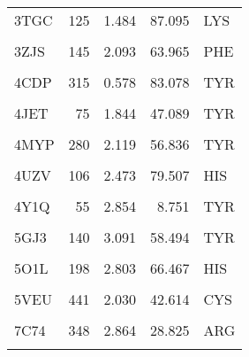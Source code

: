 \begin{table}
{\begin{tabular}{lrrrl}
				\addlinespace
				3TGC & 125 & 1.484 & 87.095 & LYS\\
				\cellcolor{gray!6}{3VP5} & \cellcolor{gray!6}{149} & \cellcolor{gray!6}{2.237} & \cellcolor{gray!6}{49.264} & \cellcolor{gray!6}{HIS}\\
				3ZJS & 145 & 2.093 & 63.965 & PHE\\
				\cellcolor{gray!6}{4B8N} & \cellcolor{gray!6}{71} & \cellcolor{gray!6}{1.755} & \cellcolor{gray!6}{70.933} & \cellcolor{gray!6}{HIS}\\
				4CDP & 315 & 0.578 & 83.078 & TYR\\
				\addlinespace
				\cellcolor{gray!6}{4I3Q} & \cellcolor{gray!6}{105} & \cellcolor{gray!6}{1.866} & \cellcolor{gray!6}{38.216} & \cellcolor{gray!6}{ARG}\\
				4JET & 75 & 1.844 & 47.089 & TYR\\
				\cellcolor{gray!6}{4MF9} & \cellcolor{gray!6}{331} & \cellcolor{gray!6}{1.736} & \cellcolor{gray!6}{79.914} & \cellcolor{gray!6}{PHE}\\
				4MYP & 280 & 2.119 & 56.836 & TYR\\
				\cellcolor{gray!6}{4NL5} & \cellcolor{gray!6}{55} & \cellcolor{gray!6}{2.707} & \cellcolor{gray!6}{25.915} & \cellcolor{gray!6}{THR}\\
				\addlinespace
				4UZV & 106 & 2.473 & 79.507 & HIS\\
				\cellcolor{gray!6}{4XZD} & \cellcolor{gray!6}{75} & \cellcolor{gray!6}{1.999} & \cellcolor{gray!6}{46.839} & \cellcolor{gray!6}{TYR}\\
				4Y1Q & 55 & 2.854 & 8.751 & TYR\\
				\cellcolor{gray!6}{5CN5} & \cellcolor{gray!6}{93} & \cellcolor{gray!6}{2.970} & \cellcolor{gray!6}{82.799} & \cellcolor{gray!6}{HIS}\\
				5GJ3 & 140 & 3.091 & 58.494 & TYR\\
				\addlinespace
				\cellcolor{gray!6}{5KZL} & \cellcolor{gray!6}{15} & \cellcolor{gray!6}{2.756} & \cellcolor{gray!6}{59.949} & \cellcolor{gray!6}{HIS}\\
				5O1L & 198 & 2.803 & 66.467 & HIS\\
				\cellcolor{gray!6}{5O1M} & \cellcolor{gray!6}{230} & \cellcolor{gray!6}{2.457} & \cellcolor{gray!6}{48.514} & \cellcolor{gray!6}{THR}\\
				5VEU & 441 & 2.030 & 42.614 & CYS\\
				\cellcolor{gray!6}{6A2J} & \cellcolor{gray!6}{278} & \cellcolor{gray!6}{2.230} & \cellcolor{gray!6}{63.931} & \cellcolor{gray!6}{HIS}\\
				\addlinespace
				7C74 & 348 & 2.864 & 28.825 & ARG\\
				\cellcolor{gray!6}{7DMR} & \cellcolor{gray!6}{354} & \cellcolor{gray!6}{2.321} & \cellcolor{gray!6}{48.490} & \cellcolor{gray!6}{VAL}\\
				\bottomrule
		\end{tabular}}
	\end{table}